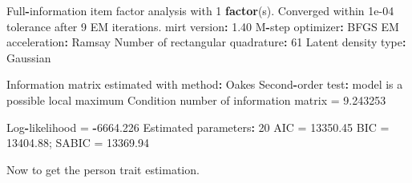 \documentclass[
]{article}
\newenvironment{Shaded}{\begin{snugshade}}{\end{snugshade}}
\newcommand{\DecValTok}[1]{\textcolor[rgb]{0.00,0.00,0.81}{#1}}
\newcommand{\FloatTok}[1]{\textcolor[rgb]{0.00,0.00,0.81}{#1}}
\newcommand{\FunctionTok}[1]{\textcolor[rgb]{0.13,0.29,0.53}{\textbf{#1}}}
\newcommand{\NormalTok}[1]{#1}
\newcommand{\OtherTok}[1]{\textcolor[rgb]{0.56,0.35,0.01}{#1}}
\newcommand{\SpecialCharTok}[1]{\textcolor[rgb]{0.81,0.36,0.00}{\textbf{#1}}}
\begin{document}
\begin{Shaded}
\begin{Highlighting}[]
\NormalTok{Full}\SpecialCharTok{{-}}\NormalTok{information item factor analysis with }\DecValTok{1} \FunctionTok{factor}\NormalTok{(s).}
\NormalTok{Converged within }\FloatTok{1e{-}04}\NormalTok{ tolerance after }\DecValTok{9}\NormalTok{ EM iterations.}
\NormalTok{mirt version}\SpecialCharTok{:} \FloatTok{1.40} 
\NormalTok{M}\SpecialCharTok{{-}}\NormalTok{step optimizer}\SpecialCharTok{:}\NormalTok{ BFGS }
\NormalTok{EM acceleration}\SpecialCharTok{:}\NormalTok{ Ramsay }
\NormalTok{Number of rectangular quadrature}\SpecialCharTok{:} \DecValTok{61}
\NormalTok{Latent density type}\SpecialCharTok{:}\NormalTok{ Gaussian }

\NormalTok{Information matrix estimated with method}\SpecialCharTok{:}\NormalTok{ Oakes}
\NormalTok{Second}\SpecialCharTok{{-}}\NormalTok{order test}\SpecialCharTok{:}\NormalTok{ model is a possible local maximum}
\NormalTok{Condition number of information matrix }\OtherTok{=}  \FloatTok{9.243253}

\NormalTok{Log}\SpecialCharTok{{-}}\NormalTok{likelihood }\OtherTok{=} \SpecialCharTok{{-}}\FloatTok{6664.226}
\NormalTok{Estimated parameters}\SpecialCharTok{:} \DecValTok{20} 
\NormalTok{AIC }\OtherTok{=} \FloatTok{13350.45}
\NormalTok{BIC }\OtherTok{=} \FloatTok{13404.88}\NormalTok{; SABIC }\OtherTok{=} \FloatTok{13369.94}
\end{Highlighting}
\end{Shaded}

Now to get the person trait estimation.
\end{document}
